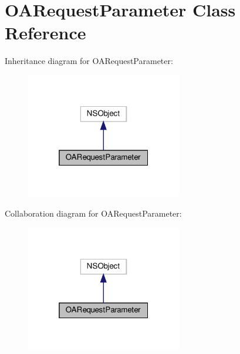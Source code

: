 \hypertarget{interfaceOARequestParameter}{}\section{O\+A\+Request\+Parameter Class Reference}
\label{interfaceOARequestParameter}


Inheritance diagram for O\+A\+Request\+Parameter\+:
\nopagebreak
\begin{figure}[H]
\begin{center}
\leavevmode
\includegraphics[width=193pt]{interfaceOARequestParameter__inherit__graph}
\end{center}
\end{figure}


Collaboration diagram for O\+A\+Request\+Parameter\+:
\nopagebreak
\begin{figure}[H]
\begin{center}
\leavevmode
\includegraphics[width=193pt]{interfaceOARequestParameter__coll__graph}
\end{center}
\end{figure}
